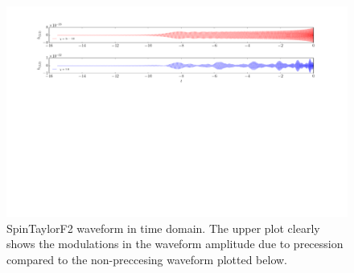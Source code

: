 \label{wf_compare}
\begin{figure}[t]
\includegraphics[width=\textwidth]{./images/TD_waveforms_comparison.pdf}
\caption{SpinTaylorF2 waveform in time domain. The upper plot clearly shows the modulations in the waveform amplitude due to precession compared 
to the non-preccesing waveform plotted below.}
\centering
\end{figure}

